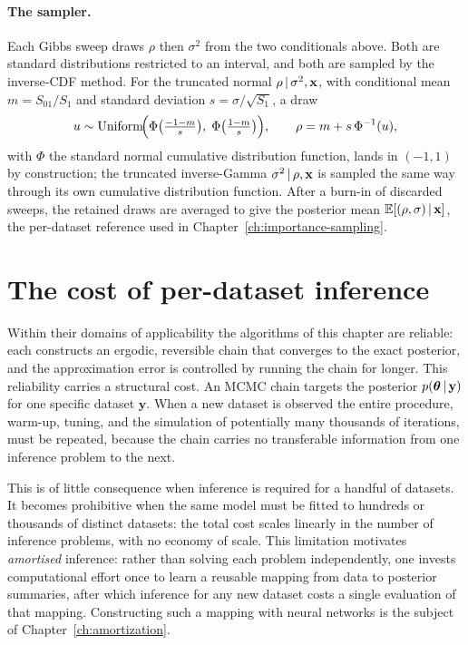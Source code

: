 \paragraph{The sampler.}
Each Gibbs sweep draws $\rho$ then $\sigma^2$ from the two
conditionals above. Both are standard distributions restricted to an
interval, and both are sampled by the inverse-CDF method. For the
truncated normal $\rho \,|\, \sigma^2, \mathbf{x}$, with conditional
mean $m = S_{01}/S_1$ and standard deviation $s = \sigma/\sqrt{S_1}$,
a draw
%
\begin{equation}
  u \sim \mathrm{Uniform}\!\Big(
  \Phi\big(\tfrac{-1-m}{s}\big),\;
  \Phi\big(\tfrac{1-m}{s}\big)\Big),
  \qquad
  \rho = m + s\,\Phi^{-1}(u),
\end{equation}
%
with $\Phi$ the standard normal cumulative distribution function,
lands in $(-1, 1)$ by construction; the truncated inverse-Gamma
$\sigma^2 \,|\, \rho, \mathbf{x}$ is sampled the same way through its
own cumulative distribution function. After a burn-in of discarded
sweeps, the retained draws are averaged to give the posterior mean
$\mathbb{E}[(\rho, \sigma) \,|\, \mathbf{x}]$, the per-dataset reference used
in Chapter~\ref{ch:importance-sampling}.

\section{The cost of per-dataset inference}
\label{sec:mcmc-cost}

Within their domains of applicability the algorithms of this chapter
are reliable: each constructs an ergodic, reversible chain that
converges to the exact posterior, and the approximation error is
controlled by running the chain for longer. This reliability carries a
structural cost. An MCMC chain targets the posterior
$p(\bm{\theta} \,|\, \mathbf{y})$ for one specific dataset
$\mathbf{y}$. When a new dataset is observed the entire procedure,
warm-up, tuning, and the simulation of potentially many thousands of iterations,
must be repeated, because the chain carries no transferable
information from one inference problem to the next.

This is of little consequence when inference is required for a handful
of datasets. It becomes prohibitive when the same model must be fitted
to hundreds or thousands of distinct datasets: the total cost scales
linearly in the number of inference problems, with no economy of
scale. This limitation motivates \emph{amortised} inference: rather
than solving each problem independently, one invests computational
effort once to learn a reusable mapping from data to posterior
summaries, after which inference for any new dataset costs a single
evaluation of that mapping. Constructing such a mapping with neural
networks is the subject of Chapter~\ref{ch:amortization}.
